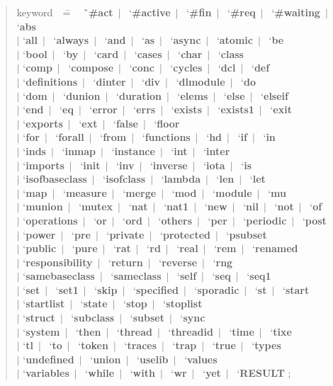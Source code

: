 \documentclass{overturerepchap}
\newcommand{\Rule}[2]{
  \begin{quote}\begin{tabbing}
    #1\index{#1}\ \ \= = \ \ \= #2  ; %

  \end{tabbing}\end{quote}
  }
\newcommand{\RuleTarget}[1]{\hypertarget{rule:#1}{}}
\newcommand{\Ruledef}[2]
{
  \RuleTarget{#1}\Rule{#1}{#2}%
  }
\newcommand{\dsepl}{\ $|$\ }
\newcommand{\dsep}{\\ \> $|$ \>}
\newcommand{\Lop}[1]{`{\bf\ttfamily #1}\Quote}
\begin{document}
{\newcommand{\Lks}[1]{\Lop{#1}\dsepl}
\newcommand{\Lksb}[1]{\Lop{#1}\dsep}
\Ruledef{keyword}{
  \Lks{\#act}
  \Lks{\#active}
  \Lks{\#fin}
  \Lks{\#req}
  \Lks{\#waiting}
  \Lksb{abs}
  \Lks{all}
  \Lks{always}
  \Lks{and}
\Lks{as}
  \Lks{async}
  \Lks{atomic}
  \Lksb{be}
  \Lks{bool}
  \Lks{by}
  \Lks{card}
  \Lks{cases}
  \Lks{char}
  \Lksb{class}
  \Lks{comp}
  \Lks{compose}
  \Lks{conc}
  \Lks{cycles}
  \Lks{dcl}
  \Lksb{def}
  \Lks{definitions}
  \Lks{dinter}
  \Lks{div}
  \Lks{dlmodule}
  \Lksb{do}
  \Lks{dom}
  \Lks{dunion}
  \Lks{duration}
  \Lks{elems}
  \Lks{else}
  \Lksb{elseif}
  \Lks{end}
  \Lks{eq}
  \Lks{error}
  \Lks{errs}
  \Lks{exists}
  \Lks{exists1}
  \Lksb{exit}
  \Lks{exports}
  \Lks{ext}
  \Lks{false}
  \Lksb{floor}
  \Lks{for}
  \Lks{forall}
  \Lks{from}
  \Lks{functions}
  \Lks{hd}
  \Lks{if}
  \Lksb{in}
  \Lks{inds}
  \Lks{inmap}
  \Lks{instance}
  \Lks{int}
  \Lksb{inter}
  \Lks{imports}
  \Lks{init}
  \Lks{inv}
  \Lks{inverse}
  \Lks{iota}
  \Lksb{is}
  \Lks{isofbaseclass}
  \Lks{isofclass}
  \Lks{lambda}
  \Lks{len}
  \Lksb{let}
  \Lks{map}
  \Lks{measure}
  \Lks{merge}
  \Lks{mod}
  \Lks{module}
  \Lksb{mu}
  \Lks{munion}
  \Lks{mutex}
  \Lks{nat}
  \Lks{nat1}
  \Lks{new}
  \Lks{nil}
  \Lks{not}
  \Lksb{of}
  \Lks{operations}
  \Lks{or}
  \Lks{ord}
  \Lks{others}
  \Lks{per}
  \Lks{periodic}
  \Lksb{post}
  \Lks{power}
  \Lks{pre}
  \Lks{private}
  \Lks{protected}
  \Lksb{psubset}
  \Lks{public}
  \Lks{pure}
  \Lks{rat}
  \Lks{rd}
  \Lks{real}
  \Lks{rem}
  \Lksb{renamed}
  \Lks{responsibility}
  \Lks{return}
  \Lks{reverse}
  \Lksb{rng}
  \Lks{samebaseclass}
  \Lks{sameclass}
  \Lks{self}
  \Lks{seq}
  \Lksb{seq1}
  \Lks{set}
  \Lks{set1}
  \Lks{skip}
  \Lks{specified}
  \Lks{sporadic}
  \Lks{st}
  \Lksb{start}
  \Lks{startlist}
  \Lks{state}
  \Lks{stop}
  \Lksb{stoplist}
  \Lks{struct}
  \Lks{subclass}
  \Lks{subset}
  \Lksb{sync}
  \Lks{system}
  \Lks{then}
  \Lks{thread}
  \Lks{threadid}
  \Lks{time}
  \Lksb{tixe}
  \Lks{tl}
  \Lks{to}
  \Lks{token}
  \Lks{traces}
  \Lks{trap}
  \Lks{true}
  \Lksb{types}
  \Lks{undefined}
  \Lks{union}
  \Lks{uselib}
  \Lksb{values}
  \Lks{variables}
  \Lks{while}
  \Lks{with}
  \Lks{wr}
  \Lks{yet}
  \Lop{RESULT}
  }


}
\end{document}
